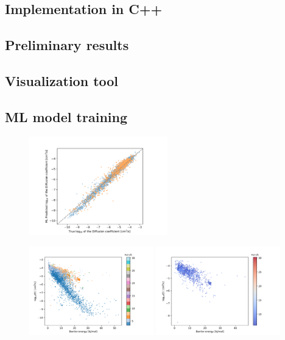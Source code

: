 \documentclass[main]{subfiles}
\begin{document}
\subsection{Implementation in C++}

\subsection{Preliminary results}

\subsection{Visualization tool}


\subsection{ML model training}

\begin{figure}[ht]
  \centering
    \includegraphics[width=6cm]{figures/5-diffusion/diffusion_prediction.pdf}
    \caption{}
    \label{fgr:}
\end{figure}

\begin{figure}[ht]
  \centering
    \includegraphics[width=0.48\textwidth]{figures/5-diffusion/difflog_barrier_Df_uff.pdf}
    \includegraphics[width=0.48\textwidth]{figures/5-diffusion/difflog_barrier_Df_uff_2.pdf}
    \caption{}
    \label{fgr:}
\end{figure}
\end{document}
